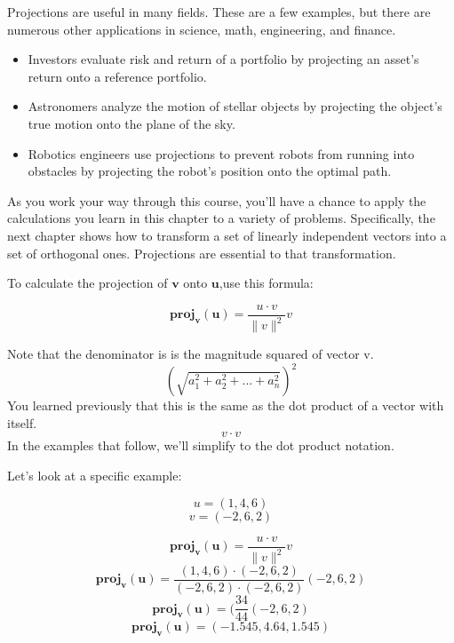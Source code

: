 
Projections are useful in many fields. These are a few examples, but there are numerous other applications in science, math, engineering, and finance.

\begin{itemize}
\item Investors evaluate risk and return of a portfolio by projecting an asset’s return onto a reference portfolio.
\item Astronomers analyze the motion of stellar objects by projecting the object’s true motion onto the plane of the sky.
\item Robotics engineers use projections to prevent robots from running into obstacles by projecting the robot’s position onto the optimal path.
\end{itemize}

As you work your way through this course, you'll have a chance to apply the calculations you learn in this chapter to a variety of problems. Specifically, the next chapter shows how to transform a set of linearly independent vectors into a set of orthogonal ones. Projections are essential to that transformation. 

To calculate the projection of 
$\mathbf{v}$ onto $\mathbf{u}$,use this formula:

$$\mathbf{proj}_\mathbf{v}(\mathbf{u}) = \frac{u\cdot v}{\parallel{v}\parallel ^2}v$$

Note that the denominator is is the magnitude squared of vector v.
$$(\sqrt{a_1^2 + a_2^2 + ... + a_n^2} )^2$$
You learned previously that this is the same as the dot product of a vector with itself.
$${v\cdot v}$$
In the examples that follow, we'll simplify to the dot product notation.

Let's look at a specific example:

$$u = (1,4,6)$$ 
$$v = (-2,6,2)$$ 

$$\mathbf{proj}_\mathbf{v}(\mathbf{u}) = \frac{u\cdot v}{\parallel {v}\parallel ^2}v$$
$$\mathbf{proj}_\mathbf{v}(\mathbf{u}) = \frac{(1,4,6)\cdot(-2,6,2)}{ (-2,6,2)\cdot (-2,6,2)}(-2,6,2)$$
$$\mathbf{proj}_\mathbf{v}(\mathbf{u}) = (\frac{34}{44}(-2,6,2)$$
$$\mathbf{proj}_\mathbf{v}(\mathbf{u}) = (-1.545, 4.64, 1.545)$$


